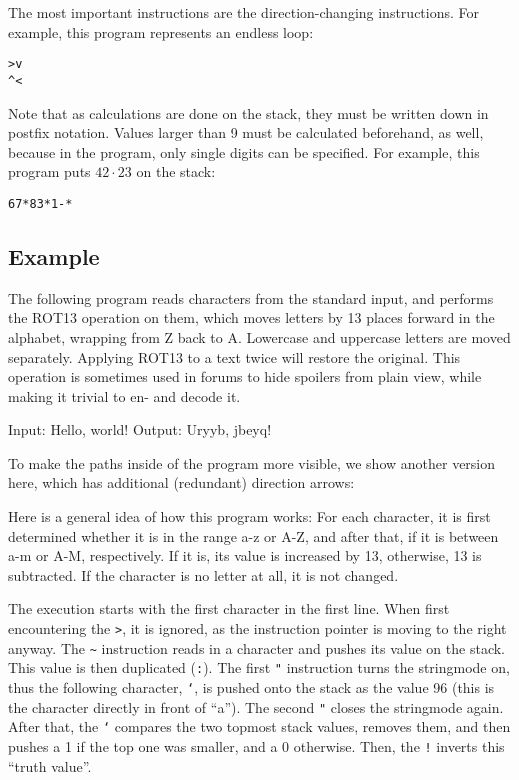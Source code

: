 The most important instructions are the direction-changing instructions. For example, this program represents an endless loop:

\begin{lstlisting}
>v
^<
\end{lstlisting}

Note that as calculations are done on the stack, they must be written down in postfix notation. Values larger than 9 must be calculated beforehand, as well, because in the program, only single digits can be specified. For example, this program puts $42\cdot 23$ on the stack:

\begin{lstlisting}
67*83*1-*
\end{lstlisting}

\subsection{Example}

The following program reads characters from the standard input, and performs the ROT13 operation on them, which moves letters by 13 places forward in the alphabet, wrapping from Z back to A. Lowercase and uppercase letters are moved separately. Applying ROT13 to a text twice will restore the original. This operation is sometimes used in forums to hide spoilers from plain view, while making it trivial to en- and decode it.



\begin{io}
Input: Hello, world!
Output: Uryyb, jbeyq!
\end{io}

To make the paths inside of the program more visible, we show another version here, which has additional (redundant) direction arrows:



Here is a general idea of how this program works: For each character, it is first determined whether it is in the range a-z or A-Z, and after that, if it is between a-m or A-M, respectively. If it is, its value is increased by 13, otherwise, 13 is subtracted. If the character is no letter at all, it is not changed.

The execution starts with the first character in the first line. When first encountering the \texttt{>}, it is ignored, as the instruction pointer is moving to the right anyway. The \texttt{\~} instruction reads in a character and pushes its \ascii{} value on the stack. This value is then duplicated (\texttt{:}). The first \texttt{"} instruction turns the stringmode on, thus the following character, \texttt{`}, is pushed onto the stack as the value 96 (this is the character directly in front of “a”). The second \texttt{"} closes the stringmode again. After that, the \texttt{`} compares the two topmost stack values, removes them, and then pushes a 1 if the top one was smaller, and a 0 otherwise. Then, the \texttt{!} inverts this “truth value”.

